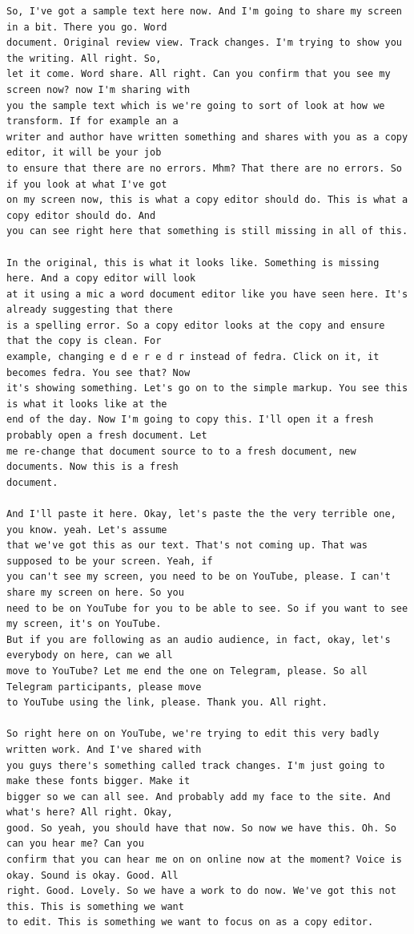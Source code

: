 {\begin{Verbatim}
So, I've got a sample text here now. And I'm going to share my screen in a bit. There you go. Word
document. Original review view. Track changes. I'm trying to show you the writing. All right. So,
let it come. Word share. All right. Can you confirm that you see my screen now? now I'm sharing with
you the sample text which is we're going to sort of look at how we transform. If for example an a
writer and author have written something and shares with you as a copy editor, it will be your job
to ensure that there are no errors. Mhm? That there are no errors. So if you look at what I've got
on my screen now, this is what a copy editor should do. This is what a copy editor should do. And
you can see right here that something is still missing in all of this.

In the original, this is what it looks like. Something is missing here. And a copy editor will look
at it using a mic a word document editor like you have seen here. It's already suggesting that there
is a spelling error. So a copy editor looks at the copy and ensure that the copy is clean. For
example, changing e d e r e d r instead of fedra. Click on it, it becomes fedra. You see that? Now
it's showing something. Let's go on to the simple markup. You see this is what it looks like at the
end of the day. Now I'm going to copy this. I'll open it a fresh probably open a fresh document. Let
me re-change that document source to to a fresh document, new documents. Now this is a fresh
document.

And I'll paste it here. Okay, let's paste the the very terrible one, you know. yeah. Let's assume
that we've got this as our text. That's not coming up. That was supposed to be your screen. Yeah, if
you can't see my screen, you need to be on YouTube, please. I can't share my screen on here. So you
need to be on YouTube for you to be able to see. So if you want to see my screen, it's on YouTube.
But if you are following as an audio audience, in fact, okay, let's everybody on here, can we all
move to YouTube? Let me end the one on Telegram, please. So all Telegram participants, please move
to YouTube using the link, please. Thank you. All right.

So right here on on YouTube, we're trying to edit this very badly written work. And I've shared with
you guys there's something called track changes. I'm just going to make these fonts bigger. Make it
bigger so we can all see. And probably add my face to the site. And what's here? All right. Okay,
good. So yeah, you should have that now. So now we have this. Oh. So can you hear me? Can you
confirm that you can hear me on on online now at the moment? Voice is okay. Sound is okay. Good. All
right. Good. Lovely. So we have a work to do now. We've got this not this. This is something we want
to edit. This is something we want to focus on as a copy editor.


\end{Verbatim}}
